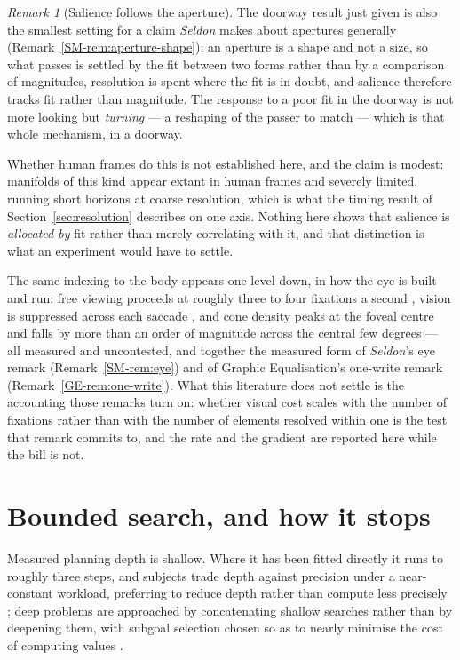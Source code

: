 \documentclass[11pt,a4paper]{article}
\theoremstyle{remark}
\newtheorem{remark}{Remark}[section]
\begin{document}
\begin{remark}[Salience follows the aperture]\label{rem:salience}
The doorway result just given is also the smallest setting for a claim \emph{Seldon} makes about
apertures generally (Remark~\ref{SM-rem:aperture-shape}): an aperture is a shape and not a size, so
what passes is settled by the fit between two forms rather than by a comparison of magnitudes,
resolution is spent where the fit is in doubt, and salience therefore tracks fit rather than
magnitude. The response to a poor fit in the doorway is not more looking but \emph{turning} --- a
reshaping of the passer to match --- which is that whole mechanism, in a doorway.

Whether human frames do this is not established here, and the claim is modest: manifolds of this kind
appear extant in human frames and severely limited, running short horizons at coarse resolution, which
is what the timing result of Section~\ref{sec:resolution} describes on one axis. Nothing here shows
that salience is \emph{allocated by} fit rather than merely correlating with it, and that distinction
is what an experiment would have to settle.
\end{remark}

The same indexing to the body appears one level down, in how the eye is built and run: free viewing
proceeds at roughly three to four fixations a second \citep{rayner1998}, vision is suppressed across
each saccade \citep{matin1974}, and cone density peaks at the foveal centre and falls by more than an
order of magnitude across the central few degrees \citep{curcio1990} --- all measured and uncontested,
and together the measured form of \emph{Seldon}'s eye remark (Remark~\ref{SM-rem:eye}) and of Graphic
Equalisation's one-write remark (Remark~\ref{GE-rem:one-write}). What this literature does not settle
is the accounting those remarks turn on: whether visual cost scales with the number of fixations rather
than with the number of elements resolved within one is the test that remark commits to, and the rate
and the gradient are reported here while the bill is not.

\section{Bounded search, and how it stops}\label{sec:search}
Measured planning depth is shallow. Where it has been fitted directly it runs to roughly three steps,
and subjects trade depth against precision under a near-constant workload, preferring to reduce
depth rather than compute less precisely \citep{snider2015}; deep problems are approached by
concatenating shallow searches rather than by deepening them, with subgoal selection chosen so as to
nearly minimise the cost of computing values \citep{huys2015}.
\end{document}
